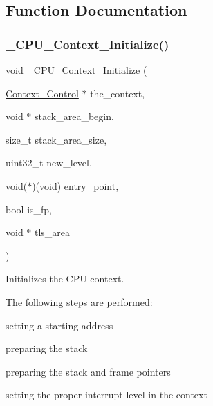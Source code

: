 \subsection{Function Documentation}
\mbox{\label{group__RTEMSScoreCPUi386_gaa92701994ad8e3b646667a3e92935ddf}} 
\subsubsection{\texorpdfstring{\_CPU\_Context\_Initialize()}{\_CPU\_Context\_Initialize()}}
{\footnotesize\ttfamily void \+\_\+\+C\+P\+U\+\_\+\+Context\+\_\+\+Initialize (\begin{DoxyParamCaption}\item[{\mbox{\hyperlink{structContext__Control}{Context\+\_\+\+Control}} $\ast$}]{the\+\_\+context,  }\item[{void $\ast$}]{stack\+\_\+area\+\_\+begin,  }\item[{size\+\_\+t}]{stack\+\_\+area\+\_\+size,  }\item[{uint32\+\_\+t}]{new\+\_\+level,  }\item[{void($\ast$)(void)}]{entry\+\_\+point,  }\item[{bool}]{is\+\_\+fp,  }\item[{void $\ast$}]{tls\+\_\+area }\end{DoxyParamCaption})}



Initializes the C\+PU context. 

The following steps are performed\+:
\begin{DoxyItemize}
\item setting a starting address
\item preparing the stack
\item preparing the stack and frame pointers
\item setting the proper interrupt level in the context
\end{DoxyItemize}


